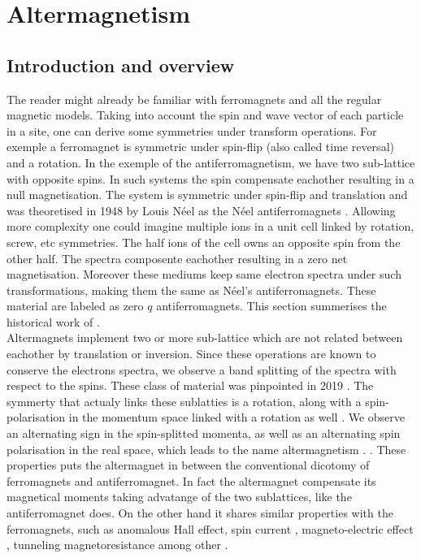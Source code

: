 \documentclass[../main.tex]{main.tex}
\begin{document}
\section{Altermagnetism}
\subsection{Introduction and overview}
The reader might already be familiar with ferromagnets and all the regular magnetic models. Taking into account the spin and
wave vector of each particle in a site, one can derive some symmetries under transform operations. For exemple a
ferromagnet is symmetric under spin-flip (also called time reversal) and a rotation. In the exemple of the antiferromagnetism,
we have two sub-lattice with opposite spins. In such systems the spin compensate eachother resulting in a null magnetisation.
The system is symmetric under spin-flip and translation and was theoretised in 1948 by Louis Néel as the Néel antiferromagnets \cite{Neel1936}.
Allowing more complexity one could imagine multiple ions in a unit cell linked by rotation, screw, etc symmetries. The half ions 
of the cell owns an opposite spin from the other half. The spectra composente eachother resulting in a zero net magnetisation.
Moreover these mediums keep same electron spectra under such transformations, making them the same as Néel's antiferromagnets.
These material are labeled as zero $q$ antiferromagnets.
This section summerises the historical work of \cite{Mazin2024}.\\

Altermagnets implement two or more sub-lattice which are not related between eachother by translation or inversion.
Since these operations are known to conserve the electrons spectra, we observe a band splitting of the spectra with respect to the spins.
These class of material was pinpointed in 2019 \cite{Hayami2019}. The symmerty that actualy links these sublatties is a rotation,
along with a spin-polarisation in the momentum space linked with a rotation as well \cite{Smejkal2022}.
We observe an alternating sign in the spin-splitted momenta, as well as an alternating spin polarisation in the real space,
which leads to the name altermagnetism \cite{Smejkal2022_2}. . These properties puts the altermagnet in between
the conventional dicotomy of ferromagnets and antiferromagnet. In fact the altermagnet compensate its magnetical moments taking advatange of the two
sublattices, like the antiferromagnet does. On the other hand it shares similar properties with the ferromagnets, such as anomalous Hall effect,
spin current \cite{Naka2021_2}, magneto-electric effect \cite{Smejkal2022_3}, tunneling magnetoresistance \cite{Smejkal2022_4} among other \cite{Smejkal2022_2}.\\
\end{document}
